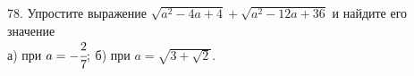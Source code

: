 78. Упростите выражение $\sqrt{a^2-4a+4}+\sqrt{a^2-12a+36}$ и найдите его значение\\
а) при $a=-\cfrac{2}{7};$ б) при $a=\sqrt{3+\sqrt{2}}.$\\
